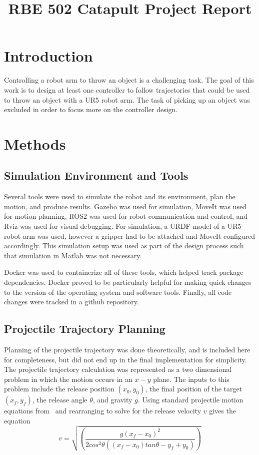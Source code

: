 \documentclass[conference]{IEEEtran}
\begin{document}
\title{RBE 502 Catapult Project Report}

\author{
}

\maketitle


\section{Introduction}
Controlling a robot arm to throw an object is a challenging task. The goal of
this work is to design at least one controller to follow trajectories that could
be used to throw an object with a UR5 robot arm. The task of picking up an
object was excluded in order to focus more on the controller design.

\section{Methods}

\subsection{Simulation Environment and Tools}
Several tools were used to simulate the robot and its environment, plan the
motion, and produce results. Gazebo was used for simulation, MoveIt was used for
motion planning, ROS2 was used for robot communication and control, and Rviz was
used for visual debugging. For simulation, a URDF model of a UR5 robot arm was
used, however a gripper had to be attached and MoveIt configured
accordingly. This simulation setup was used as part of the design process such
that simulation in Matlab was not necessary.

Docker was used to containerize all of these tools, which helped track
package dependencies. Docker proved to be particularly helpful for making quick
changes to the version of the operating system and software tools. Finally, all
code changes were tracked in a github repository.

\subsection{Projectile Trajectory Planning}
Planning of the projectile trajectory was done theoretically, and is included
here for completeness, but did not end up in the final implementation for
simplicity. The projectile trajectory calculation was represented as a
two dimensional problem in which the motion occurs in an $x-y$ plane. The inputs
to this problem include the release position $(x_0, y_0)$, the final position of
the target $(x_f, y_f)$, the release angle $\theta$, and gravity $g$. Using
standard projectile motion equations from~\cite{william25} and rearranging to
solve for the release velocity $v$ gives the equation
\begin{equation*}
  v = \sqrt{ \left(\frac{g(x_f-x_0)^2}{2 cos^2\theta ((x_f-x_0) tan \theta - y_f + y_0)} \right ) }
\end{equation*}
\end{document}
